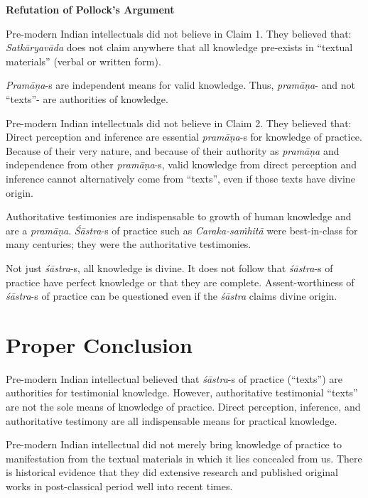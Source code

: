 \newpage

{\bf Refutation of Pollock's Argument}

Pre-modern Indian intellectuals did not believe in Claim 1.  They believed that:
\textsl{Satkāryavāda} does not claim anywhere that all knowledge pre-exists in ``textual materials'' (verbal or written form).

\textsl{Pramāņa}-s are independent means for valid knowledge. Thus, {\sl pramāṇa}- and not ``texts''- are authorities of knowledge.

Pre-modern Indian intellectuals did not believe in Claim 2.  They believed that:
Direct perception and inference are essential \hbox{{\sl pramāṇa}-s} for knowledge of practice.  Because of their very nature, and because of their authority as {\sl pramāṇa} and independence from other {\sl pramāṇa}-s, valid knowledge from direct perception and inference cannot alternatively come from ``texts'', even if those texts have divine origin.

Authoritative testimonies are indispensable to growth of human knowledge and are a {\sl pramāṇa}.  {\sl Śāstra}-s of practice such as {\sl Caraka-saṁhitā} were best-in-class for many centuries; they were the authoritative testimonies.

Not just {\sl śāstra}-s, all knowledge is divine. It does not follow that {\sl śāstra}-s of practice have perfect knowledge or that they are complete.
Assent-worthiness of {\sl śāstra}-s of practice can be questioned even if the {\sl śāstra} claims divine origin.

\section*{Proper Conclusion}

Pre-modern Indian intellectual believed that {\sl śāstra}-s of practice (``texts'') are authorities for testimonial knowledge. However, authoritative testimonial ``texts'' are not the sole means of knowledge of practice. Direct perception, inference, and authoritative testimony are all indispensable means for practical knowledge.

Pre-modern Indian intellectual did not merely bring knowledge of practice to manifestation from the textual materials in which it lies concealed from us. There is historical evidence that they did extensive research and published original works in post-classical period well into recent times.

